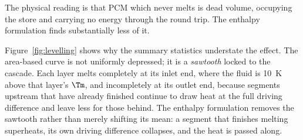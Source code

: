 The physical reading is that PCM which never melts is dead volume, occupying the
store and carrying no energy through the round trip. The enthalpy formulation
finds substantially less of it.

Figure~\ref{fig:levelling} shows why the summary statistics understate the
effect. The area-based curve is not uniformly depressed; it is a \emph{sawtooth}
locked to the cascade. Each layer melts completely at its inlet end, where the
fluid is \SI{10}{\kelvin} above that layer's $\Tm$, and incompletely at its
outlet end, because segments upstream that have already finished continue to
draw heat at the full driving difference and leave less for those behind. The
enthalpy formulation removes the sawtooth rather than merely shifting its mean:
a segment that finishes melting superheats, its own driving difference
collapses, and the heat is passed along.
